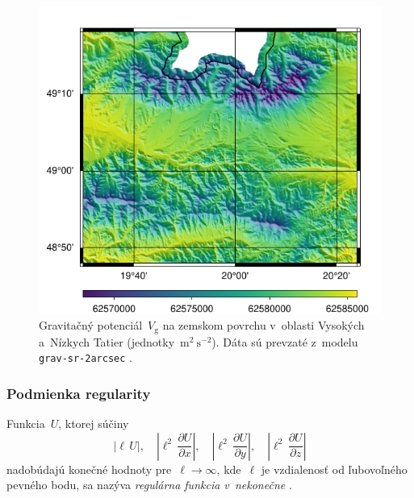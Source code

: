 \documentclass[a4paper, 12pt]{book}
\newcommand{\gidx}{\mathrm g}
\begin{document}
\begin{figure}
\centering
\includegraphics{./fig-vg-grav-sr-2arcsec.pdf}
\caption{Gravitačný potenciál~$V_\gidx$ na zemskom povrchu v~oblasti Vysokých
a~Nízkych Tatier (jednotky~$\mathrm{m}^2 \ \mathrm{s}^{-2}$).  Dáta sú prevzaté
z~modelu \texttt{grav-sr-2arcsec} \parencite{GravSR2arcsec}.}
\label{fig:vg_grav_sr_2arcsec}
\end{figure}

\subsubsection{Podmienka regularity}

Funkcia~$U$, ktorej súčiny
%
\begin{equation}
\label{eq:regular_function}
\left| \ell \, U \right|{,} \quad \left| \ell^2 \, \frac{\partial U}{\partial 
x} \right|{,} \quad \left| \ell^2 \, \frac{\partial U}{\partial y} \right| {,} 
\quad \left| \ell^2 \, \frac{\partial U}{\partial z} \right|
\end{equation}
%
nadobúdajú konečné hodnoty pre~$\ell \rightarrow \infty$, kde~$\ell$ je 
vzdialenosť od ľubovoľného pevného bodu, sa nazýva \emph{regulárna funkcia 
v~nekonečne} \parencite{Kellogg1967,Pick1973}.
\end{document}
